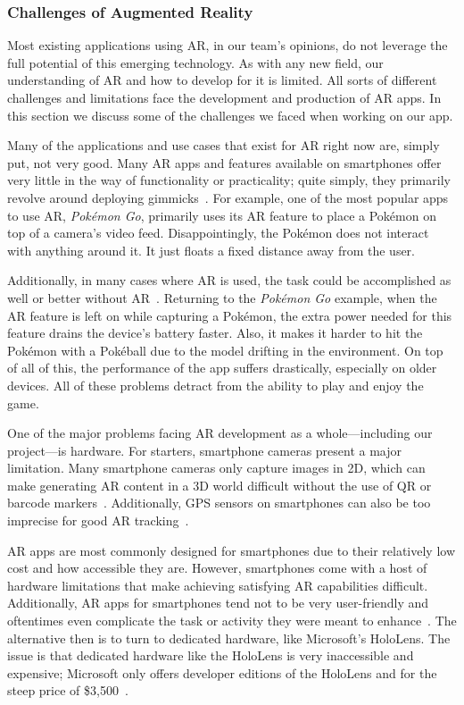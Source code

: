 \documentclass[a4paper, 10pt, american, titlepage]{article}
\begin{document}
\subsubsection{Challenges of Augmented Reality}
\label{sec:challengesOfAugmentedReality}

Most existing applications using AR, in our team's opinions, do not leverage the
full potential of this emerging technology. As with any new field, our
understanding of AR and how to develop for it is limited. All sorts of different
challenges and limitations face the development and production of AR apps. In
this section we discuss some of the challenges we faced when working on our app.

Many of the applications and use cases that exist for AR right now are, simply
put, not very good. Many AR apps and features available on smartphones offer
very little in the way of functionality or practicality; quite simply, they
primarily revolve around deploying gimmicks~\autocite{theappsolutions2018}. For
example, one of the most popular apps to use AR, \textit{Pokémon Go}, primarily
uses its AR feature to place a Pokémon on top of a camera's video feed.
Disappointingly, the Pokémon does not interact with anything around it. It just
floats a fixed distance away from the user.

Additionally, in many cases where AR is used, the task could be accomplished as
well or better without AR~\autocite{theappsolutions2018}. Returning to the
\textit{Pokémon Go} example, when the AR feature is left on while capturing a
Pokémon, the extra power needed for this feature drains the device's battery
faster. Also, it makes it harder to hit the Pokémon with a Pokéball due to the
model drifting in the environment. On top of all of this, the performance of
the app suffers drastically, especially on older devices. All of these problems
detract from the ability to play and enjoy the game.

One of the major problems facing AR development as a whole---including our
project---is hardware. For starters, smartphone cameras present a
major limitation. Many smartphone cameras only capture images in 2D, which can
make generating AR content in a 3D world difficult without the use of QR or
barcode markers~\autocite{geospatialworld2018}. Additionally, GPS sensors on
smartphones can also be too imprecise for good AR
tracking~\autocite{geospatialworld2018}.

AR apps are most commonly designed for smartphones due to their relatively low
cost and how accessible they are. However, smartphones come with a host of
hardware limitations that make achieving satisfying AR capabilities difficult.
Additionally, AR apps for smartphones tend not to be very user-friendly and
oftentimes even complicate the task or activity they were meant to
enhance~\autocite{theappsolutions2018}.  The alternative then is to turn to
dedicated hardware, like Microsoft's HoloLens. The issue is that dedicated
hardware like the HoloLens is very inaccessible and expensive; Microsoft only
offers developer editions of the HoloLens and for the steep price of
\$3,500~\autocite{microsoft2019}.
\end{document}
